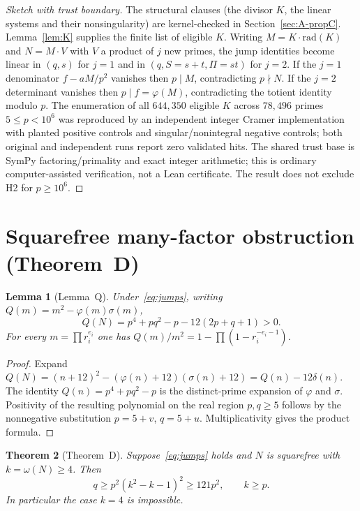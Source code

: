 \documentclass[11pt,reqno]{amsart}
\newcommand{\ph}{\varphi}
\newcommand{\sig}{\sigma}
\newtheorem{theorem}{Theorem}
\newtheorem{lemma}[theorem]{Lemma}
\theoremstyle{definition}
\begin{document}
\begin{proof}[Sketch with trust boundary]
The structural clauses (the divisor \(K\), the linear systems and their nonsingularity) are kernel-checked in Section~\ref{sec:A-propC}. Lemma~\ref{lem:K} supplies the finite list of eligible \(K\). Writing \(M=K\cdot\mathrm{rad}(K)\) and \(N=M\cdot V\) with \(V\) a product of \(j\) new primes, the jump identities become linear in \((q,s)\) for \(j=1\) and in \((q,S=s+t,\Pi=st)\) for \(j=2\). If the \(j=1\) denominator \(f-aM/p^2\) vanishes then \(p\mid M\), contradicting \(p\nmid N\). If the \(j=2\) determinant vanishes then \(p\mid f=\ph(M)\), contradicting the totient identity modulo \(p\). The enumeration of all \(644{,}350\) eligible \(K\) across \(78{,}496\) primes \(5\le p<10^6\) was reproduced by an independent integer Cramer implementation with planted positive controls and singular/nonintegral negative controls; both original and independent runs report zero validated hits. The shared trust base is SymPy factoring/primality and exact integer arithmetic; this is ordinary computer-assisted verification, not a Lean certificate. The result does not exclude H2 for \(p\ge 10^6\).
\end{proof}

\section{Squarefree many-factor obstruction (Theorem~D)}
\label{sec:thmD}

\begin{lemma}[Lemma~Q]
\label{lem:Q}
Under~\eqref{eq:jumps}, writing \(Q(m)=m^2-\ph(m)\sig(m)\),
\[
Q(N)=p^4+pq^2-p-12(2p+q+1)>0.
\]
For every \(m=\prod r_i^{e_i}\) one has \(Q(m)/m^2=1-\prod(1-r_i^{-e_i-1})\).
\end{lemma}

\begin{proof}
Expand \(Q(N)=(n+12)^2-(\ph(n)+12)(\sig(n)+12)=Q(n)-12\delta(n)\). The identity \(Q(n)=p^4+pq^2-p\) is the distinct-prime expansion of \(\ph\) and \(\sig\). Positivity of the resulting polynomial on the real region \(p,q\ge 5\) follows by the nonnegative substitution \(p=5+v\), \(q=5+u\). Multiplicativity gives the product formula.
\end{proof}

\begin{theorem}[Theorem~D]
\label{thm:D}
Suppose~\eqref{eq:jumps} holds and \(N\) is squarefree with \(k=\omega(N)\ge 4\). Then
\[
q\ge p^2(k^2-k-1)^2\ge 121p^2,\qquad k\ge p.
\]
In particular the case \(k=4\) is impossible.
\end{theorem}
\end{document}
